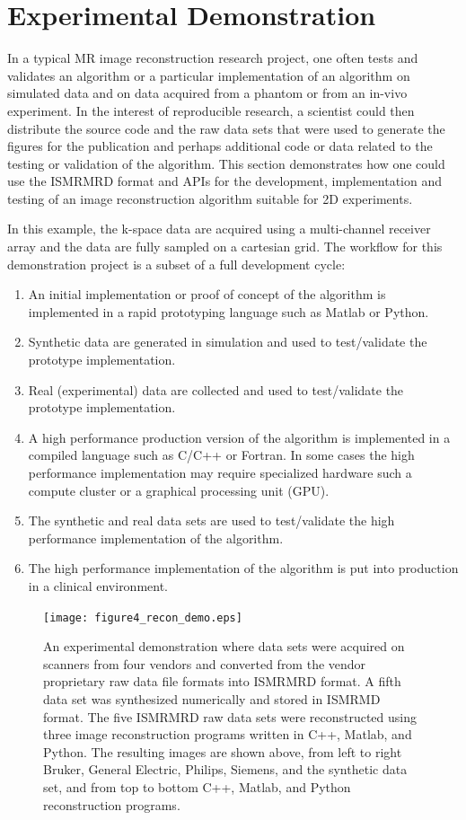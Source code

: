 \documentclass[12pt]{article}
\begin{document}
\section*{Experimental Demonstration}
In a typical MR image reconstruction research project, one often tests and validates an algorithm or a particular implementation of an algorithm on simulated data and on data acquired from a phantom or from an in-vivo experiment.  In the interest of reproducible research, a scientist could then distribute the source code and the raw data sets that were used to generate the figures for the publication and perhaps additional code or data related to the testing or validation of the algorithm.
This section demonstrates how one could use the ISMRMRD format and APIs for the development, implementation and testing of an image reconstruction algorithm suitable for 2D experiments.

In this example, the k-space data are acquired using a multi-channel receiver array and the data are fully sampled on a cartesian grid.  The workflow for this demonstration project is a subset of a full development cycle:
\begin{enumerate}
\item An initial implementation or proof of concept of the algorithm is implemented in a rapid prototyping language such as Matlab or Python.
\item Synthetic data are generated in simulation and used to test/validate the prototype implementation.
\item Real (experimental) data are collected and used to test/validate the prototype implementation.
\item A high performance production version of the algorithm is implemented in a compiled language such as C/C++ or Fortran.  In some cases the high performance implementation may require specialized hardware such a compute cluster or a graphical processing unit (GPU).
\item The synthetic and real data sets are used to test/validate the high performance implementation of the algorithm.
\item The high performance implementation of the algorithm is put into production in a clinical environment.
\end{enumerate}

\begin{figure}
\begin{center}
\texttt{[image: figure4\_recon\_demo.eps]}
\end{center}
\caption{An experimental demonstration where data sets were acquired on scanners from four vendors and converted from the vendor proprietary raw data file formats into ISMRMRD format.  A fifth data set was synthesized numerically and stored in ISMRMD format.  The five ISMRMRD raw data sets were reconstructed using three image reconstruction programs written in C++, Matlab, and Python.  The resulting images are shown above, from left to right Bruker, General Electric, Philips, Siemens, and the synthetic data set,  and from top to bottom C++, Matlab, and Python reconstruction programs.}
\label{fig:demo}
\end{figure}
\end{document}
